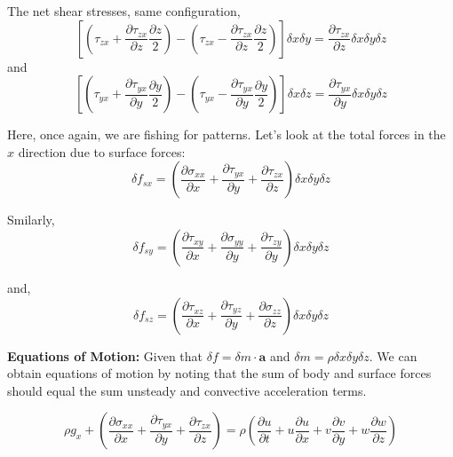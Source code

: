 \documentclass[10pt,a4paper,draft]{article}
\begin{document}
The net shear stresses, same configuration,
$$
\left[
	\left(
	\tau_{zx} 
	+ \frac{\partial \tau_{zx}}{\partial z} \frac{\partial z}{2}
	\right)
	-
	\left(
	\tau_{zx} 
	- \frac{\partial \tau_{zx}}{\partial z} \frac{\partial z}{2}
	\right)
\right] \delta x\delta y
= \frac{\partial \tau_{zx}}{\partial z} \delta x\delta y\delta z
$$ 
and
$$
\left[
	\left(
	\tau_{yx} 
	+ \frac{\partial \tau_{yx}}{\partial y} \frac{\partial y}{2}
	\right)
	-
	\left(
	\tau_{yx} 
	- \frac{\partial \tau_{yx}}{\partial y} \frac{\partial y}{2}
	\right)
\right] \delta x\delta z
= \frac{\partial \tau_{yx}}{\partial y} \delta x\delta y\delta z
$$ 

Here, once again, we are fishing for patterns. Let's look at the total forces in the $x$ direction due to surface forces:
$$
\delta f_{sx} 
= 
\left(
	\frac{\partial \sigma_{xx}}{\partial x} + \frac{\partial \tau_{yx}}{\partial y} + \frac{\partial \tau_{zx}}{\partial z} 
\right) \delta x\delta y\delta z
$$

Smilarly,
$$
\delta f_{sy} 
= 
\left(
	\frac{\partial \tau_{xy}}{\partial x} + \frac{\partial \sigma_{yy}}{\partial y} + \frac{\partial \tau_{zy}}{\partial y} 
\right) \delta x\delta y\delta z
$$

and,
$$
\delta f_{sz} 
= 
\left(
	\frac{\partial \tau_{xz}}{\partial x} + \frac{\partial \tau_{yz}}{\partial y} + \frac{\partial \sigma_{zz}}{\partial z} 
\right) \delta x\delta y\delta z
$$

\textbf{Equations of Motion:}
Given that $\delta f = \delta m \cdot \mathbf{a}$ and $\delta m = \rho \delta x\delta y\delta z$. 
We can obtain equations of motion by noting that the sum of body and surface forces should equal the sum unsteady and convective acceleration terms.
 
$$
\rho g_x 
+ 
\left(
	\frac{\partial \sigma_{xx}}{\partial x} + \frac{\partial \tau_{yx}}{\partial y} + \frac{\partial \tau_{zx}}{\partial z} 
\right)
= \rho 
\left( 
	\frac{\partial u}{\partial t} 
+ u \frac{\partial u}{\partial x}
+ v \frac{\partial v}{\partial y}
+ w \frac{\partial w}{\partial z}
\right)
$$
\end{document}
